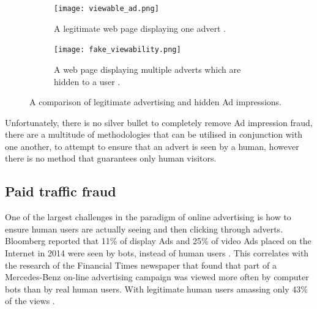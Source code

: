 \documentclass[12pt]{article}
\begin{document}
\begin{figure}[H]
    \begin{subfigure}{0.3\textwidth}
        \texttt{[image: viewable\_ad.png]}
        \caption{A legitimate web page displaying one advert \parencite{spiderIo}.}
        \label{fig:legitAd}
    \end{subfigure} \hspace{0.2\textwidth}
    \begin{subfigure}{0.3\textwidth}
        \texttt{[image: fake\_viewability.png]}
        \caption{A web page displaying multiple adverts which are hidden to a user \parencite{spiderIo}.}
        \label{fig:adFraud}
    \end{subfigure}
    \caption{A comparison of legitimate advertising and hidden Ad impressions.}
    \label{fig:adstack}
\end{figure}

Unfortunately, there is no silver bullet to completely remove Ad impression fraud, there are a multitude of methodologies that can be utilised in conjunction with one another, to attempt to ensure that an advert is seen by a human, however there is no method that guarantees only human visitors. 

\subsection{Paid traffic fraud}
One of the largest challenges in the paradigm of online advertising is how to ensure human users are actually seeing and then clicking through adverts. Bloomberg reported that 11\% of display Ads and 25\% of video Ads placed on the Internet in 2014 were seen by bots, instead of human users \parencite{bloomFraud}. This correlates with the research of the Financial Times newspaper that found that part of a Mercedes-Benz on-line advertising campaign was viewed more often by computer bots than by real human users. With legitimate human users amassing only 43\% of the views \parencite{mercFraud}. \\
\end{document}
